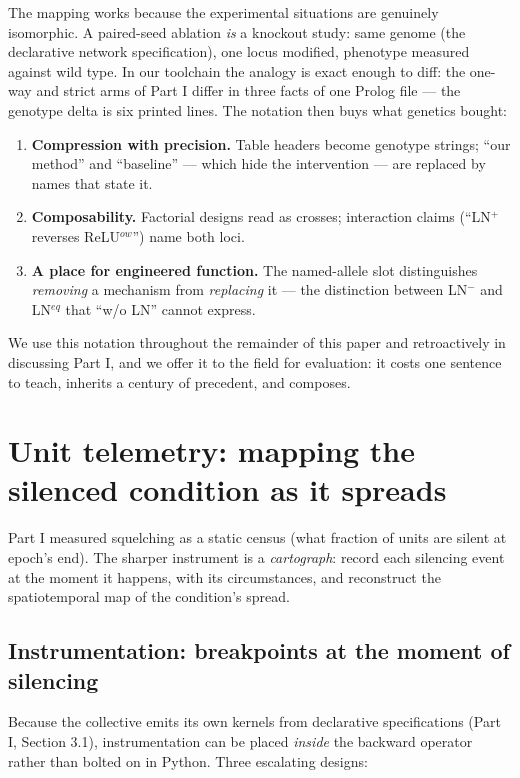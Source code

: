 \documentclass[11pt]{article}
\begin{document}
The mapping works because the experimental situations are genuinely
isomorphic. A paired-seed ablation \emph{is} a knockout study: same
genome (the declarative network specification), one locus modified,
phenotype measured against wild type. In our toolchain the analogy
is exact enough to diff: the one-way and strict arms of Part I
differ in three facts of one Prolog file --- the genotype delta is
six printed lines. The notation then buys what genetics bought:
\begin{enumerate}
\item \textbf{Compression with precision.} Table headers become
genotype strings; ``our method'' and ``baseline'' --- which hide the
intervention --- are replaced by names that state it.
\item \textbf{Composability.} Factorial designs read as crosses;
interaction claims (``LN$^{+}$ reverses ReLU$^{\mathit{ow}}$'')
name both loci.
\item \textbf{A place for engineered function.} The named-allele
slot distinguishes \emph{removing} a mechanism from \emph{replacing}
it --- the distinction between LN$^{-}$ and LN$^{\mathit{eq}}$ that
``w/o LN'' cannot express.
\end{enumerate}

We use this notation throughout the remainder of this paper and
retroactively in discussing Part I, and we offer it to the field for
evaluation: it costs one sentence to teach, inherits a century of
precedent, and composes.

\section{Unit telemetry: mapping the silenced condition as it
spreads}
\label{sec:cartography}

Part I measured squelching as a static census (what fraction of units
are silent at epoch's end). The sharper instrument is a
\emph{cartograph}: record each silencing event at the moment it
happens, with its circumstances, and reconstruct the spatiotemporal
map of the condition's spread.

\subsection{Instrumentation: breakpoints at the moment of silencing}

Because the collective emits its own kernels from declarative
specifications (Part I, Section 3.1), instrumentation can be placed
\emph{inside} the backward operator rather than bolted on in Python.
Three escalating designs:
\end{document}
